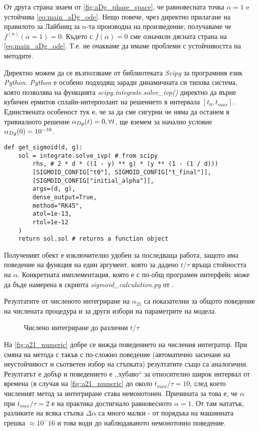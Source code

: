От друга страна знаем от \autoref{fig:aDg_phase_space}, че равновесната точка $\alpha = 1$ e устойчива \autoref{eq:main_aDg_ode}. Нещо повече, чрез директно прилагане на правилото за Лайбниц за $n$-та производна на произведение, получаваме че $f^{(n)} (\alpha = 1)  = 0$. Където с $f(\alpha) = 0$ сме означили дясната страна на \autoref{eq:main_aDg_ode}. Т.е. не очакваме да имаме проблеми с устойчивостта на методите.

Директно можем да се възползваме от библиотеката \textit{Scipy} \cite{2020SciPy-NMeth} за програмния език \textit{Python}. \textit{Python} е особено подходящ заради динамичната си типова система, която позволява на функцията \textit{scipy.integrate.solve_ivp()} директно да върне кубичен ермитов сплайн-интерполант на решението в интервала $[t_0, t_{max}]$. 
Единствената особеност тук е, че за да сме сигурни че няма да останем в тривиалното решение $\alpha_{Dg}(t) = 0, \forall t$, ще вземем за начално условие $\alpha_{Dg}(0) = 10^{-10}$.
\begin{verbatim}
def get_sigmoid(d, g):
    sol = integrate.solve_ivp( # from scipy
        rhs, # 2 * d * ((1 - y) ** g) * (y ** (1 - (1 / d)))
        [SIGMOID_CONFIG["t0"], SIGMOID_CONFIG["t_final"]],
        [SIGMOID_CONFIG["initial_alpha"]],
        args=(d, g),
        dense_output=True,
        method="RK45",
        atol=1e-13,
        rtol=1e-12
    )
    return sol.sol # returns a function object
\end{verbatim}
Полученият обект е изключително удобен за последваща работа, защото има поведение на функция на един аргумент, която за дадено $t/\tau$ връща стойността на $\alpha$. Конкретната имплементация, която е с по-общ програмен интерфейс може да бъде намерена в скрипта \textit{sigmoid_calculation.py} от \cite{SigmoidToolsGH}.

Резултатите от численото интегриране на $\alpha_{21}$ са показателни за общото поведение на числената процедура и за други избори на параметрите на модела.
\begin{figure}[!ht]
    \centering
    \caption{Числено интегриране до различни $t/\tau$}
    \label{fig:a21_numeric}
\end{figure}

\noindent На \autoref{fig:a21_numeric} добре се вижда поведението на числения интегратор. При смяна на метода с такъв с по-сложно поведение (автоматично засичане на неустойчивост и съответен избор на стъпката) резултатите също са аналогични. Резултатът е добър и поведението е ,,хубаво`` за относително широк интервал от времена (в случая на  \autoref{fig:a21_numeric} до около $t_{max}/\tau = 10$, след което численият метод за интегриране става немонотонен. Причината за това е, че $\alpha$ при $t_{max}/\tau = 2$ е на практика достигнало равновесното $\alpha = 1$. От там нататък, разликите на всяка стъпка $\Delta \alpha$ са много малки - от порядъка на машинната грешка $\approx 10^-16$ и това води до наблюдаваното немонотонно поведение.

